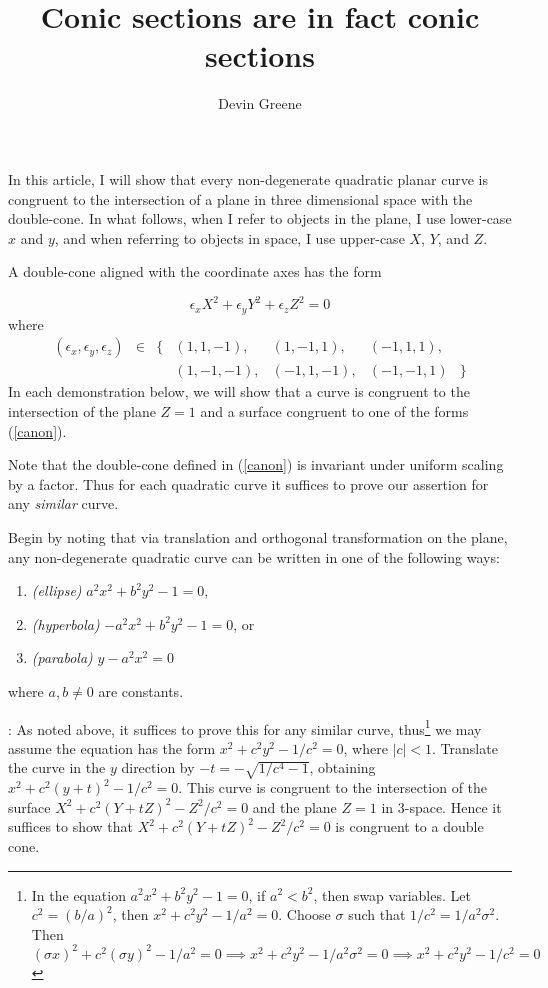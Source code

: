 \documentclass[12pt]{article}
\title{Conic sections are in fact conic sections}
\author{Devin Greene}
\date{}
\newcommand{\eps}{\epsilon}
\begin{document}
\maketitle

In this article, I will show that every non-degenerate quadratic
planar curve is congruent to the intersection of a plane in three
dimensional space with the double-cone.  In what follows, when I 
refer to objects in the plane, I use lower-case $x$ and $y$, and
when referring to objects in space, I use upper-case $X$, $Y$, and
$Z$.

A double-cone aligned with the coordinate axes has the form 

\begin{equation} \label{canon} \eps_x X^2 + \eps_y Y^2 + \eps_z
Z^2 = 0\end{equation}
where
$$\begin{matrix}(\eps_x,\eps_y,\eps_z) & \in  &
\{ &(1,1,-1),&(1,-1,1),&(-1,1,1), &\\
&&&(1,-1,-1),&(-1,1,-1),&(-1,-1,1) &\}\end{matrix}$$
In each demonstration below, we will show that a curve is congruent to
the intersection of the plane $Z = 1$ and a surface congruent to one
of the forms (\ref{canon}).

Note that the double-cone defined in (\ref{canon}) is invariant under
uniform scaling by a factor.  Thus for each quadratic curve it
suffices to prove our assertion for any {\it similar} curve.

Begin by noting that via translation and orthogonal transformation on
the plane, any non-degenerate quadratic curve can be written in one of
the following ways:

\begin{enumerate}
\item {\it (ellipse)} $a^2x^2 + b^2y^2 - 1 = 0$,
\item {\it (hyperbola)} $-a^2x^2 + b^2y^2 - 1 = 0$, or
\item {\it (parabola)} $y - a^2x^2 = 0$
\end{enumerate}
where $a,b \neq 0$ are constants.

\medskip

: As noted above, it suffices to prove this for
any similar curve, thus\footnote{
In the equation $a^2x^2 + b^2y^2 - 1 = 0$, if $a^2 < b^2$, then swap
variables.  Let $c^2 = (b/a)^2$, then $x^2 + c^2 y^2 - 1/a^2 = 0$.
Choose $\sigma$ such that $1/c^2 = 1/a^2\sigma^2$.  Then
$(\sigma x)^2
+ c^2 (\sigma y)^2 - 1/a^2 = 0 \implies x^2  + c^2 y^2 - 1/a^2\sigma^2
= 0 \implies x^2 + c^2 y^2 - 1/c^2 = 0$
}
we may assume the
equation has the form $x^2 + c^2 y^2 - 1/c^2 = 0$, where $|c| < 1$. Translate the curve in the $y$ direction by $-t = -\sqrt{1/c^4 - 1}$,
obtaining $x^2 + c^2 (y + t)^2 - 1/c^2 = 0$.  This curve is congruent to
the intersection of the surface $X^2 + c^2 (Y + tZ)^2 - Z^2/c^2 = 0$ and
the plane $Z = 1$ in 3-space.  Hence it suffices to show that $ X^2 +
c^2 (Y + tZ)^2 - Z^2/c^2 = 0$ is congruent to a double cone.
\end{document}
